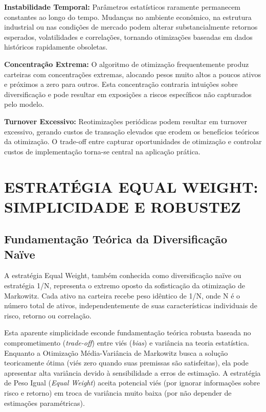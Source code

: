 \textbf{Instabilidade Temporal:} Parâmetros estatísticos raramente permanecem constantes ao longo do tempo. Mudanças no ambiente econômico, na estrutura industrial ou nas condições de mercado podem alterar substancialmente retornos esperados, volatilidades e correlações, tornando otimizações baseadas em dados históricos rapidamente obsoletas.

\textbf{Concentração Extrema:} O algoritmo de otimização frequentemente produz carteiras com concentrações extremas, alocando pesos muito altos a poucos ativos e próximos a zero para outros. Esta concentração contraria intuições sobre diversificação e pode resultar em exposições a riscos específicos não capturados pelo modelo.

\textbf{Turnover Excessivo:} Reotimizações periódicas podem resultar em turnover excessivo, gerando custos de transação elevados que erodem os benefícios teóricos da otimização. O trade-off entre capturar oportunidades de otimização e controlar custos de implementação torna-se central na aplicação prática.

\section{ESTRATÉGIA EQUAL WEIGHT: SIMPLICIDADE E ROBUSTEZ}

\subsection{Fundamentação Teórica da Diversificação Naïve}

A estratégia Equal Weight, também conhecida como diversificação naïve ou estratégia 1/N, representa o extremo oposto da sofisticação da otimização de Markowitz. Cada ativo na carteira recebe peso idêntico de 1/N, onde N é o número total de ativos, independentemente de suas características individuais de risco, retorno ou correlação.

Esta aparente simplicidade esconde fundamentação teórica robusta baseada no comprometimento (\textit{trade-off}) entre viés (\textit{bias}) e variância na teoria estatística. Enquanto a Otimização Média-Variância de Markowitz busca a solução teoricamente ótima (viés zero quando suas premissas são satisfeitas), ela pode apresentar alta variância devido à sensibilidade a erros de estimação. A estratégia de Peso Igual (\textit{Equal Weight}) aceita potencial viés (por ignorar informações sobre risco e retorno) em troca de variância muito baixa (por não depender de estimações paramétricas).

